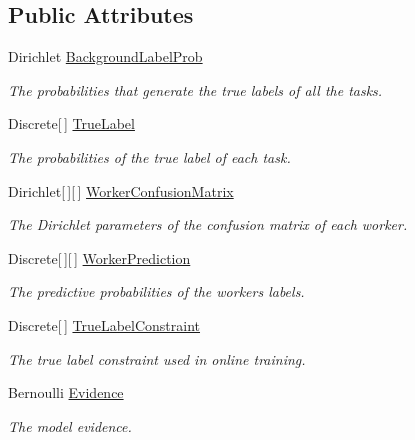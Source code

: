 \subsection*{Public Attributes}
\begin{DoxyCompactItemize}
\item 
Dirichlet \hyperlink{class_crowdsourcing_models_1_1_b_c_c_posteriors_aaac52193d90fcc91d50472ddf6683eab}{Background\+Label\+Prob}
\begin{DoxyCompactList}\small\item\em The probabilities that generate the true labels of all the tasks. \end{DoxyCompactList}\item 
Discrete\mbox{[}$\,$\mbox{]} \hyperlink{class_crowdsourcing_models_1_1_b_c_c_posteriors_ab5020db40be02d3dedd50d61371e84c8}{True\+Label}
\begin{DoxyCompactList}\small\item\em The probabilities of the true label of each task. \end{DoxyCompactList}\item 
Dirichlet\mbox{[}$\,$\mbox{]}\mbox{[}$\,$\mbox{]} \hyperlink{class_crowdsourcing_models_1_1_b_c_c_posteriors_ab9ba40964b3fa2c9c349282dafa79fbb}{Worker\+Confusion\+Matrix}
\begin{DoxyCompactList}\small\item\em The Dirichlet parameters of the confusion matrix of each worker. \end{DoxyCompactList}\item 
Discrete\mbox{[}$\,$\mbox{]}\mbox{[}$\,$\mbox{]} \hyperlink{class_crowdsourcing_models_1_1_b_c_c_posteriors_a2bf09db28d0e9cdf9c6816c9e798ec95}{Worker\+Prediction}
\begin{DoxyCompactList}\small\item\em The predictive probabilities of the worker\textquotesingle{}s labels. \end{DoxyCompactList}\item 
Discrete\mbox{[}$\,$\mbox{]} \hyperlink{class_crowdsourcing_models_1_1_b_c_c_posteriors_ac3b5fc60bf5d2a625a7638bf5af91474}{True\+Label\+Constraint}
\begin{DoxyCompactList}\small\item\em The true label constraint used in online training. \end{DoxyCompactList}\item 
Bernoulli \hyperlink{class_crowdsourcing_models_1_1_b_c_c_posteriors_a9b35421059e1ce53b9eadccfe4d559bf}{Evidence}
\begin{DoxyCompactList}\small\item\em The model evidence. \end{DoxyCompactList}\end{DoxyCompactItemize}


